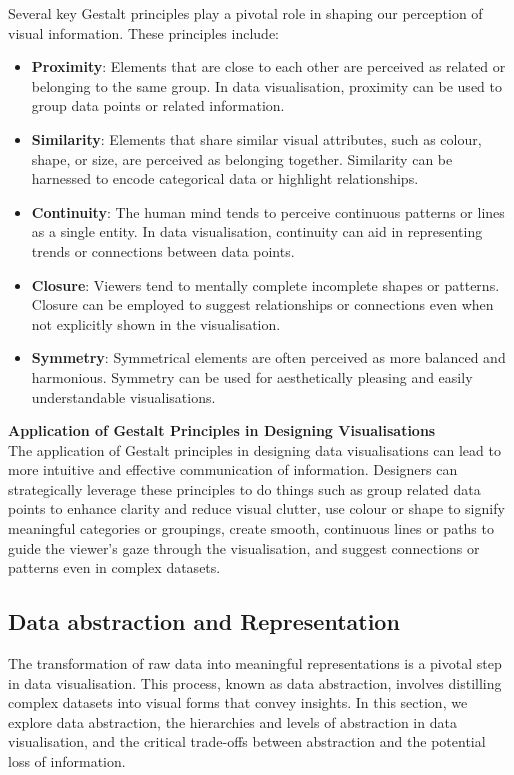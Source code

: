 \documentclass{article}\usepackage[]{graphicx}\usepackage[]{xcolor}
\begin{document}
Several key Gestalt principles play a pivotal role in shaping our perception of visual information. These principles include: 
\begin{itemize}
    \item \textbf{Proximity}: Elements that are close to each other are perceived as related or belonging to the same group. In data visualisation, proximity can be used to group data points or related information.
    \item \textbf{Similarity}: Elements that share similar visual attributes, such as colour, shape, or size, are perceived as belonging together. Similarity can be harnessed to encode categorical data or highlight relationships. 
    \item \textbf{Continuity}: The human mind tends to perceive continuous patterns or lines as a single entity. In data visualisation, continuity can aid in representing trends or connections between data points.
    \item \textbf{Closure}: Viewers tend to mentally complete incomplete shapes or patterns. Closure can be employed to suggest relationships or connections even when not explicitly shown in the visualisation.
    \item \textbf{Symmetry}: Symmetrical elements are often perceived as more balanced and harmonious. Symmetry can be used for aesthetically pleasing and easily understandable visualisations.
\end{itemize}

\textbf{Application of Gestalt Principles in Designing Visualisations}\\
The application of Gestalt principles in designing data visualisations can lead to more intuitive and effective communication of information. Designers can strategically leverage these principles to do things such as group related data points to enhance clarity and reduce visual clutter, use colour or shape to signify meaningful categories or groupings, create smooth, continuous lines or paths to guide the viewer's gaze through the visualisation, and suggest connections or patterns even in complex datasets.


\subsection{Data abstraction and Representation}
The transformation of raw data into meaningful representations is a pivotal step in data visualisation. This process, known as data abstraction, involves distilling complex datasets into visual forms that convey insights. In this section, we explore data abstraction, the hierarchies and levels of abstraction in data visualisation, and the critical trade-offs between abstraction and the potential loss of information.
\end{document}
